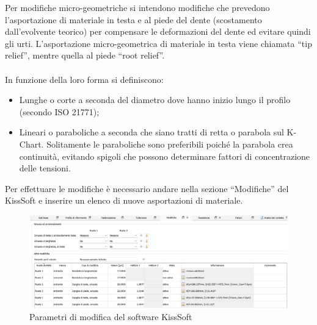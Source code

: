 Per modifiche micro-geometriche si intendono modifiche che prevedono l’asportazione di materiale in testa e al piede del dente (scostamento dall’evolvente teorico) per compensare le deformazioni del dente ed evitare quindi gli urti. L’asportazione micro-geometrica di materiale in testa viene chiamata “tip relief”, mentre quella al piede “root relief”. \\
\\
In funzione della loro forma si definiscono:
\begin{itemize}
    \item Lunghe o corte a seconda del diametro dove hanno inizio lungo il profilo (secondo ISO 21771);
    \item Lineari o paraboliche a seconda che siano tratti di retta o parabola sul K-Chart. Solitamente le paraboliche sono preferibili poiché la parabola crea continuità, evitando spigoli che possono determinare fattori di concentrazione delle tensioni. 
\end{itemize}
\newpage
Per effettuare le modifiche è necessario andare nella sezione “Modifiche” del KissSoft e inserire un elenco di nuove asportazioni di materiale.
\begin{figure}[h]
    \centering
    \includegraphics[scale=0.5]{Immagini/ModificheKissSoft.png}
    \caption{Parametri di modifica del software KissSoft}
    \label{fig:ModificheKissSoft}
\end{figure}

